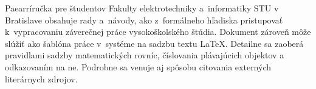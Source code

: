 Paearríručka pre študentov Fakulty elektrotechniky 
a~informatiky STU v Bratislave obsahuje rady a~návody, 
ako z~formálneho hľadiska pristupovať k~vypracovaniu 
záverečnej práce vysokoškolského štúdia.
Dokument zároveň môže slúžiť ako šablóna práce
v~systéme na sadzbu textu \LaTeX.
Detailne sa zaoberá pravidlami sadzby
matematických rovníc,
číslovania plávajúcich objektov a odkazovaním na ne. 
Podrobne sa venuje aj spôsobu citovania externých 
literárnych zdrojov.